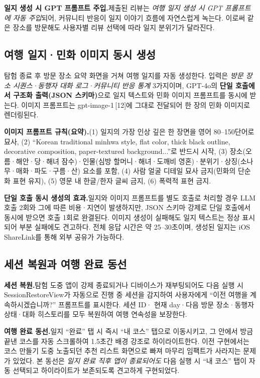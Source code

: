 \documentclass[10pt,twocolumn,a4paper]{article}
\begin{document}
\textbf{일지 생성 시 GPT 프롬프트 주입.}\quad 제출된 리뷰는 \emph{여행 일지
생성 시 GPT 프롬프트에 자동 주입}되어, 커뮤니티 반응이 일지 이야기 흐름에
자연스럽게 녹는다. 이로써 같은 장소를 방문해도 사용자별 리뷰 선택에 따라
일지 분위기가 달라진다.

\subsection{여행 일지·민화 이미지 동시 생성}

탐험 종료 후 방문 장소 요약 화면을 거쳐 여행 일지를 자동 생성한다. 입력은
\emph{방문 장소 시퀀스·동행자 대화 로그·커뮤니티 반응 통계} 3가지이며,
GPT-4o의 \textbf{단일 호출에서 구조화 출력(JSON 스키마)}으로 일지 텍스트와
민화 이미지 프롬프트를 동시에 받는다. 이미지 프롬프트는 gpt-image-1\,[12]에
그대로 전달되어 한 장의 민화 이미지로 렌더링된다.

\textbf{이미지 프롬프트 규칙(요약).}\quad (1) 일지의 가장 인상 깊은 한 장면을
영어 80--150단어로 묘사, (2) ``Korean traditional minhwa style, flat color,
thick black outline, decorative composition, paper-textured background...''로
반드시 시작, (3) 장소(오름·해안·당·해녀 잠수)·인물(심방 할머니·해녀·도깨비
영혼)·분위기·상징(소나무·매화·파도·구름·산) 요소를 포함, (4) 사람 얼굴
디테일 묘사 금지(민화의 단순화 표현 유지), (5) 영문 내 한글/한자 글씨 금지,
(6) 폭력적 표현 금지.

\textbf{단일 호출 동시 생성의 효과.}\quad 일지와 이미지 프롬프트를 별도
호출로 처리할 경우 LLM 호출 2회와 그에 따른 비용·지연이 발생하지만, JSON
스키마 강제로 단일 호출에서 동시에 받으면 호출 1회로 완결된다. 이미지
생성이 실패해도 일지 텍스트는 정상 표시되어 부분 실패에도 견고하다. 전체
응답 시간은 약 25--30초이며, 생성된 일지는 iOS ShareLink를 통해 외부
공유가 가능하다.

\subsection{세션 복원과 여행 완료 동선}

\textbf{세션 복원.}\quad 탐험 도중 앱이 강제 종료되거나 디바이스가 재부팅되어도
다음 실행 시 SessionRestoreView가 자동으로 진행 중 세션을 감지하여
사용자에게 ``이전 여행을 계속하시겠습니까?'' 프롬프트를 표시한다. 세션 ID·
현재 day·다음 방문 장소·동행자 상태·대화 히스토리를 모두 복원하여 여행
연속성을 보장한다.

\textbf{여행 완료 동선.}\quad 일지 ``완료'' 탭 시 즉시 ``내 코스'' 탭으로
이동시키고, 그 안에서 방금 끝낸 코스를 자동 스크롤하여 1.5초간 배경 강조로
하이라이트한다. 이전 구현에서는 코스 만들기 도중 노출되던 추천 리스트
화면으로 빠져 마무리 임팩트가 사라지는 문제가 있었다. 본 동선은 \emph{일지
완료 직후 앱이 종료되어도} 다음 실행 시 ``내 코스'' 탭이 자동 선택되고
하이라이트가 보존되도록 견고하게 구현되었다.
\end{document}
